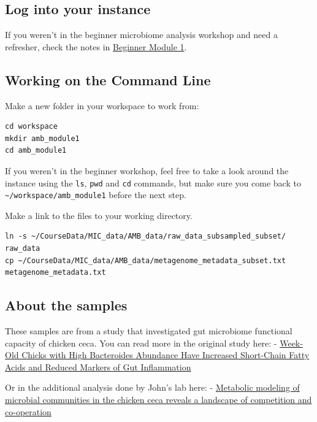\documentclass[
]{book}
\begin{document}
\subsection{Log into your instance}\label{log-into-your-instance}

If you weren't in the beginner microbiome analysis workshop and need a refresher, check the notes in \href{https://github.com/LangilleLab/microbiome_helper/wiki/CBW\%E2\%80\%902025\%E2\%80\%90BMB\%E2\%80\%90Module1\#11-log-into-your-aws-instance}{Beginner Module 1}.

\subsection{Working on the Command Line}\label{working-on-the-command-line}

Make a new folder in your workspace to work from:

\begin{verbatim}
cd workspace
mkdir amb_module1
cd amb_module1
\end{verbatim}

If you weren't in the beginner workshop, feel free to take a look around the instance using the \texttt{ls}, \texttt{pwd} and \texttt{cd} commands, but make sure you come back to \texttt{\textasciitilde{}/workspace/amb\_module1} before the next step.

Make a link to the files to your working directory.

\begin{verbatim}
ln -s ~/CourseData/MIC_data/AMB_data/raw_data_subsampled_subset/ raw_data
cp ~/CourseData/MIC_data/AMB_data/metagenome_metadata_subset.txt metagenome_metadata.txt
\end{verbatim}

\subsection{About the samples}\label{about-the-samples}

These samples are from a study that investigated gut microbiome functional capacity of chicken ceca. You can read more in the original study here:
- \href{https://journals.asm.org/doi/full/10.1128/spectrum.03616-22}{Week-Old Chicks with High Bacteroides Abundance Have Increased Short-Chain Fatty Acids and Reduced Markers of Gut Inflammation}

Or in the additional analysis done by John's lab here:
- \href{https://www.biorxiv.org/content/10.1101/2024.10.14.618310v1.full}{Metabolic modeling of microbial communities in the chicken ceca reveals a landscape of competition and co-operation}
\end{document}
